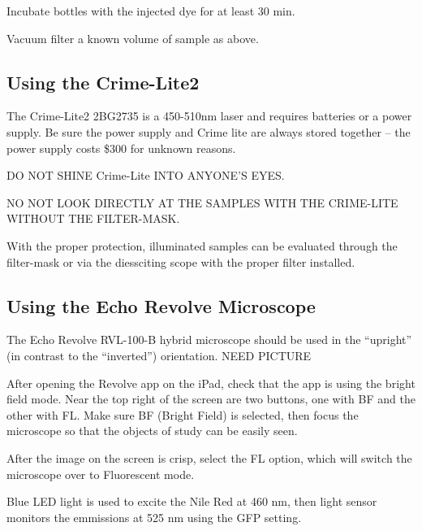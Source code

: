 \documentclass[12pt]{../SOP4_alpha}\usepackage[]{graphicx}\usepackage[]{color}
\begin{document}
\NP Incubate bottles with the injected dye for at least 30 min. 

\NP Vacuum filter a known volume of sample as above. 




\subsection{Using the Crime-Lite2}

\NP The Crime-Lite2 2BG2735 is a 450-510nm laser and requires batteries or a power supply. Be sure the power supply and Crime lite are always stored together -- the power supply costs \$300 for unknown reasons.

\NP DO NOT SHINE Crime-Lite INTO ANYONE'S EYES.

\NP NO NOT LOOK DIRECTLY AT THE SAMPLES WITH THE CRIME-LITE WITHOUT THE FILTER-MASK.

\NP With the proper protection, illuminated samples can be evaluated through the filter-mask or via the diessciting scope with the proper filter installed. 
  
\subsection{Using the Echo Revolve Microscope}

\NP The Echo Revolve RVL-100-B hybrid microscope should be used in the ``upright'' (in contrast to the ``inverted'') orientation. NEED PICTURE

\NP After opening the Revolve app on the iPad, check that the app is using the bright field mode. Near the top right of the screen are two buttons, one with BF and the other with FL. Make sure BF (Bright Field) is selected, then focus the microscope so that the objects of study can be easily seen. 

\NP After the image on the screen is crisp, select the FL option, which will switch the microscope over to Fluorescent mode. 

\NP Blue LED light is used to excite the Nile Red at 460 nm, then light sensor monitors the emmissions at 525 nm using the GFP setting.
\end{document}
